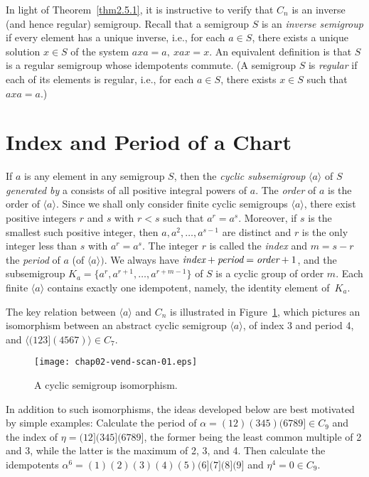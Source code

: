 \documentclass{surv-l}
\numberwithin{equation}{section}
\numberwithin{table}{section}
\numberwithin{figure}{section}
\theoremstyle{definition}
\begin{document}
In light of Theorem~\ref{thm2.5.1}, it is instructive to verify
that $C_{n}$ is an inverse (and hence regular) semigroup. Recall
that a semigroup $S$ is an \emph{inverse semigroup} if every element has a unique inverse, i.e., for each
$a\in S$, there exists a unique solution $x\in S$ of the system
$axa=a,\ xax=x$. An equivalent definition is that $S$ is a regular
semigroup whose idempotents commute. (A semigroup $S$ is
\emph{regular} if each of its elements is regular,
i.e., for each $a\in S$, there exists $x\in S$ such that $axa=a.$)

\section{Index and Period of a Chart}\label{sec2.6}

If $a$ is any element in any semigroup $S$, then the \emph{cyclic
subsemigroup} $\langle a\rangle$ of $S$ \emph{generated by} a
consists of all positive integral powers of $a$. The \emph{order}
of $a$ is the order of $\langle a\rangle$. Since we shall only
consider finite cyclic semigroups $\langle a\rangle$, there exist
positive integers $r$ and $s$ with $r<s$ such that $a^{r}=a^{s}$.
Moreover, if $s$ is the smallest such positive integer, then
$a,a^{2},\ldots,a^{s-1}$ are distinct and $r$ is the only integer
less than $s$ with $a^{r}=a^{s}$. The integer $r$ is called the
\emph{index} and $m=s-r$ the
\emph{period} of $a$ (of $\langle a\rangle)$. We
always have $\emph{index} +\emph{period}
=\emph{order}+1$, and the subsemigroup
$K_{a}=\{a^{r},a^{r+1},\ldots, a^{r+m-1}\}$ of $S$ is a cyclic
group of order $m$. Each finite $\langle a\rangle$ contains
exactly one idempotent, namely, the identity element of~$K_{a}$.

The key relation between $\langle a\rangle$ and $C_{n}$ is
illustrated in Figure~\ref{fig2.6.1}, which pictures an
isomorphism between an abstract cyclic semigroup $\langle
a\rangle$, of index 3 and period 4, and
$\langle(123](4567)\rangle\in C_{7}$.

\begin{figure}[!h]
\texttt{[image: chap02-vend-scan-01.eps]}
\caption{A cyclic semigroup isomorphism.\label{fig2.6.1}}
\end{figure}

In addition to such isomorphisms, the ideas developed below are
best motivated by simple examples: Calculate the period of
$\alpha=(12)(345)(6789]\in C_{9}$ and the index of
$\eta=(12](345](6789]$, the former being the least common multiple
of 2 and 3, while the latter is the maximum of 2, 3, and 4. Then
calculate the idempotents $\alpha^{6}=(1)(2)(3)(4)(5)(6](7](8](9]$
and $\eta^{4}=0\in C_{9}$.
\end{document}
